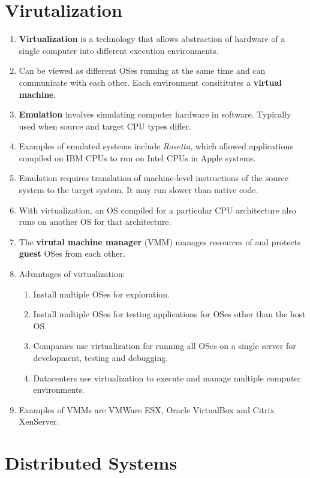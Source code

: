 \documentclass[journal,12pt,twocolumn]{IEEEtran}
\begin{document}
\section{Virutalization}

\begin{enumerate}
    \item \textbf{Virtualization} is a technology that allows abstraction of 
    hardware of a single computer into different execution environments.
    \item Can be viewed as different OSes running at the same time and can 
    communicate with each other. Each environment consititutes a 
    \textbf{virtual machine}.
    \item \textbf{Emulation} involves simulating computer hardware in software. 
    Typically used when source and target CPU types differ.
    \item Examples of emulated systems include \textit{Rosetta}, which allowed 
    applications compiled on IBM CPUs to run on Intel CPUs in Apple systems.
    \item Emulation requires translation of machine-level instructions of the
    source system to the target system. It may run slower than native code.
    \item With virtualization, an OS compiled for a particular CPU architecture
    also runs on another OS for that architecture.
    \item The \textbf{virutal machine manager} (VMM) manages resources of and 
    protects \textbf{guest} OSes from each other.
    \item Advantages of virtualization:
    \begin{enumerate}
        \item Install multiple OSes for exploration.
        \item Install multiple OSes for testing applications for OSes other than 
        the host OS.
        \item Companies use virtualization for running all OSes on a single 
        server for development, testing and debugging.
        \item Datacenters use virtualization to execute and manage multiple
        computer environments.
    \end{enumerate}
    \item Examples of VMMs are VMWare ESX, Oracle VirtualBox and Citrix 
    XenServer.
\end{enumerate}

\section{Distributed Systems}
\end{document}
